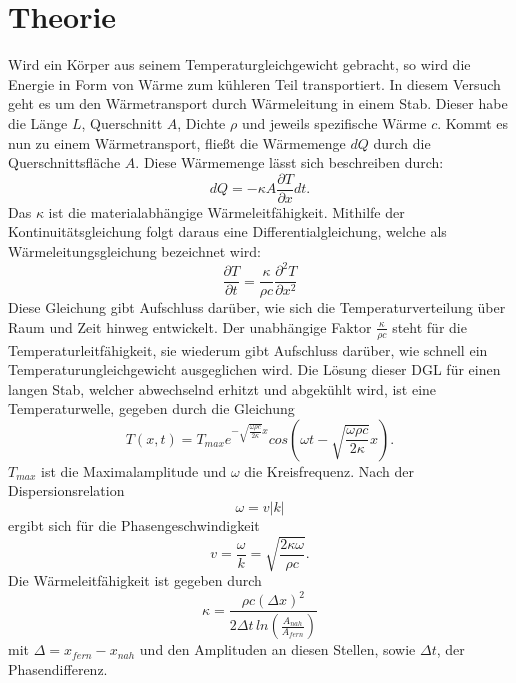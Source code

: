 \section{Theorie}
\label{sec:Theorie}

Wird ein Körper aus seinem Temperaturgleichgewicht gebracht, so wird die Energie 
in Form von Wärme zum kühleren Teil transportiert. In diesem Versuch geht es 
um den Wärmetransport durch Wärmeleitung in einem Stab. Dieser habe die Länge 
$L$, Querschnitt $A$, Dichte $\rho$ und jeweils spezifische Wärme $c$. Kommt 
es nun zu einem Wärmetransport, fließt die Wärmemenge $dQ$ durch die Querschnittsfläche
$A$. Diese Wärmemenge lässt sich beschreiben durch:
\begin{equation}
    dQ = - \kappa A \frac{\partial T}{\partial x} dt.
\end{equation}
Das $\kappa$ ist die materialabhängige Wärmeleitfähigkeit. Mithilfe der 
Kontinuitätsgleichung folgt daraus eine Differentialgleichung, welche als 
Wärmeleitungsgleichung bezeichnet wird:
\begin{equation}
    \frac{\partial T}{\partial t} = \frac{\kappa}{\rho c} \frac{\partial ^2 T}{\partial x^2}
\end{equation}
Diese Gleichung gibt Aufschluss darüber, wie sich die Temperaturverteilung 
über Raum und Zeit hinweg entwickelt. Der unabhängige Faktor $\frac{\kappa}{\rho c}$
steht für die Temperaturleitfähigkeit, sie wiederum gibt Aufschluss darüber, 
wie schnell ein Temperaturungleichgewicht ausgeglichen wird. Die Lösung dieser 
DGL für einen langen Stab, welcher abwechselnd erhitzt und abgekühlt wird, ist 
eine Temperaturwelle, gegeben durch die Gleichung 
\begin{equation}
    T(x,t)=T_{max}e^{-\sqrt{\frac{\omega \rho c}{2\kappa}}x}cos(\omega t - \sqrt{\frac{\omega \rho c}{2\kappa}}x).
\end{equation}
$T_{max}$ ist die Maximalamplitude und $\omega$ die Kreisfrequenz. Nach der 
Dispersionsrelation
\begin{equation}
    \omega = v |k|
\end{equation}
ergibt sich für die Phasengeschwindigkeit
\begin{equation}
    v = \frac{\omega}{k} = \sqrt{\frac{2\kappa \omega}{\rho c}}.
\end{equation}
Die Wärmeleitfähigkeit ist gegeben durch 
\begin{equation}
    \kappa = \frac{\rho c(\Delta x)^2}{2 \Delta t \, ln(\frac{A_{nah}}{A_{fern}})}
\end{equation}
mit $\Delta = x_{fern} - x_{nah}$ und den Amplituden an diesen Stellen, sowie 
$\Delta t$, der Phasendifferenz.